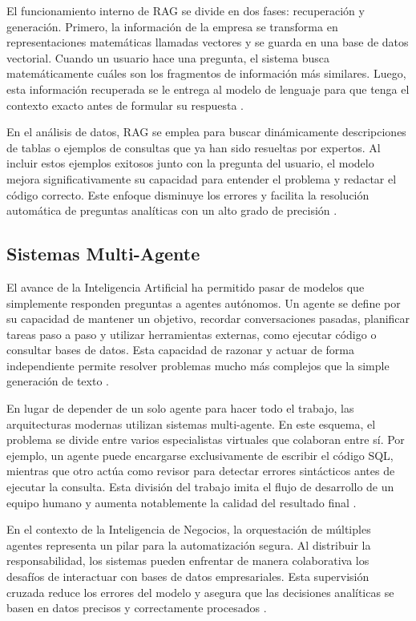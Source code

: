El funcionamiento interno de RAG se divide en dos fases: recuperación y
generación. Primero, la información de la empresa se transforma en
representaciones matemáticas llamadas vectores y se guarda en una base de datos
vectorial. Cuando un usuario hace una pregunta, el sistema busca matemáticamente
cuáles son los fragmentos de información más similares. Luego, esta información
recuperada se le entrega al modelo de lenguaje para que tenga el contexto exacto
antes de formular su respuesta \citep{gao2024retrieval}.

En el análisis de datos, RAG se emplea para buscar dinámicamente descripciones
de tablas o ejemplos de consultas que ya han sido resueltas por expertos. Al
incluir estos ejemplos exitosos junto con la pregunta del usuario, el modelo
mejora significativamente su capacidad para entender el problema y redactar el
código correcto. Este enfoque disminuye los errores y facilita la resolución
automática de preguntas analíticas con un alto grado de precisión
\citep{LeveragingNLPAndRAGModelsForAutomatedBusinessIntelligenceQueryResolution}.

\subsection{Sistemas Multi-Agente}

El avance de la Inteligencia Artificial ha permitido pasar de modelos que
simplemente responden preguntas a agentes autónomos. Un agente se define por su
capacidad de mantener un objetivo, recordar conversaciones pasadas, planificar
tareas paso a paso y utilizar herramientas externas, como ejecutar código o
consultar bases de datos. Esta capacidad de razonar y actuar de forma
independiente permite resolver problemas mucho más complejos que la simple
generación de texto \citep{maddila2024agentes}.

En lugar de depender de un solo agente para hacer todo el trabajo, las
arquitecturas modernas utilizan sistemas multi-agente. En este esquema, el
problema se divide entre varios especialistas virtuales que colaboran entre sí.
Por ejemplo, un agente puede encargarse exclusivamente de escribir el código
SQL, mientras que otro actúa como revisor para detectar errores sintácticos
antes de ejecutar la consulta. Esta división del trabajo imita el flujo de
desarrollo de un equipo humano y aumenta notablemente la calidad del resultado
final \citep{wang2024macsql}.

En el contexto de la Inteligencia de Negocios, la orquestación de múltiples
agentes representa un pilar para la automatización segura. Al distribuir la
responsabilidad, los sistemas pueden enfrentar de manera colaborativa los
desafíos de interactuar con bases de datos empresariales. Esta supervisión
cruzada reduce los errores del modelo y asegura que las decisiones analíticas
se basen en datos precisos y correctamente procesados
\citep{gartner2025predicciones}.


